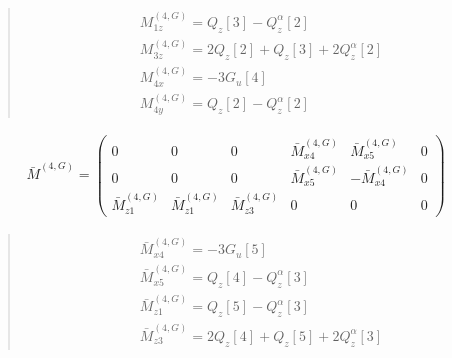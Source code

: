 \documentclass[fleqn,10pt]{jsarticle}
\begin{document}
\begin{quote}
\begin{align*}
& M^{(4,G)}_{1z} = Q_{z}[3] - Q_{z}^{\alpha}[2] \\
& M^{(4,G)}_{3z} = 2 Q_{z}[2] + Q_{z}[3] + 2 Q_{z}^{\alpha}[2] \\
& M^{(4,G)}_{4x} = - 3 G_{u}[4] \\
& M^{(4,G)}_{4y} = Q_{z}[2] - Q_{z}^{\alpha}[2]
\end{align*}
\end{quote}
\begin{align*}
\bar{M}^{(4,G)} = \begin{pmatrix} 0 & 0 & 0 & \bar{M}^{(4,G)}_{x4} & \bar{M}^{(4,G)}_{x5} & 0 \\ 0 & 0 & 0 & \bar{M}^{(4,G)}_{x5} & - \bar{M}^{(4,G)}_{x4} & 0 \\ \bar{M}^{(4,G)}_{z1} & \bar{M}^{(4,G)}_{z1} & \bar{M}^{(4,G)}_{z3} & 0 & 0 & 0 \end{pmatrix}
\end{align*}
\begin{quote}
\begin{align*}
& \bar{M}^{(4,G)}_{x4} = - 3 G_{u}[5] \\
& \bar{M}^{(4,G)}_{x5} = Q_{z}[4] - Q_{z}^{\alpha}[3] \\
& \bar{M}^{(4,G)}_{z1} = Q_{z}[5] - Q_{z}^{\alpha}[3] \\
& \bar{M}^{(4,G)}_{z3} = 2 Q_{z}[4] + Q_{z}[5] + 2 Q_{z}^{\alpha}[3]
\end{align*}
\end{quote}
\end{document}
